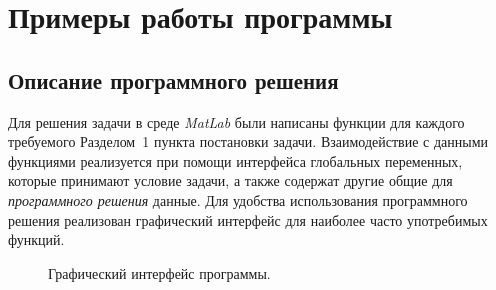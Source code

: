 \section{Примеры работы программы}

\subsection{Описание программного решения}

Для решения задачи в среде \textit{MatLab} были написаны функции для каждого требуемого Разделом~1 пункта постановки задачи. Взаимодействие с данными функциями реализуется при помощи интерфейса глобальных переменных, которые принимают условие задачи, а также содержат другие общие для \textit{программного решения} данные. Для удобства использования программного решения реализован графический интерфейс для наиболее часто употребимых функций.

\begin{figure}[h]
\noindent{}
\caption{Графический интерфейс программы.}
\label{img:app}
\end{figure}

